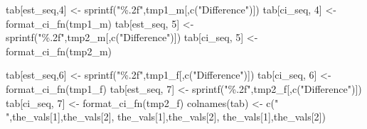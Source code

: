 \documentclass[
]{article}
\newenvironment{Shaded}{\begin{snugshade}}{\end{snugshade}}
\newcommand{\DecValTok}[1]{\textcolor[rgb]{0.00,0.00,0.81}{#1}}
\newcommand{\FunctionTok}[1]{\textcolor[rgb]{0.00,0.00,0.00}{#1}}
\newcommand{\NormalTok}[1]{#1}
\newcommand{\OtherTok}[1]{\textcolor[rgb]{0.56,0.35,0.01}{#1}}
\newcommand{\StringTok}[1]{\textcolor[rgb]{0.31,0.60,0.02}{#1}}
\begin{document}
\begin{Shaded}
\begin{Highlighting}[]
\NormalTok{  tab[est\_seq,}\DecValTok{4}\NormalTok{] }\OtherTok{\textless{}{-}} \FunctionTok{sprintf}\NormalTok{(}\StringTok{"\%.2f"}\NormalTok{,tmp1\_m[,}\FunctionTok{c}\NormalTok{(}\StringTok{"Difference"}\NormalTok{)])}
\NormalTok{  tab[ci\_seq, }\DecValTok{4}\NormalTok{] }\OtherTok{\textless{}{-}} \FunctionTok{format\_ci\_fn}\NormalTok{(tmp1\_m)}
\NormalTok{  tab[est\_seq, }\DecValTok{5}\NormalTok{] }\OtherTok{\textless{}{-}} \FunctionTok{sprintf}\NormalTok{(}\StringTok{"\%.2f"}\NormalTok{,tmp2\_m[,}\FunctionTok{c}\NormalTok{(}\StringTok{"Difference"}\NormalTok{)])}
\NormalTok{  tab[ci\_seq, }\DecValTok{5}\NormalTok{] }\OtherTok{\textless{}{-}} \FunctionTok{format\_ci\_fn}\NormalTok{(tmp2\_m)}
  
  
\NormalTok{  tab[est\_seq,}\DecValTok{6}\NormalTok{] }\OtherTok{\textless{}{-}} \FunctionTok{sprintf}\NormalTok{(}\StringTok{"\%.2f"}\NormalTok{,tmp1\_f[,}\FunctionTok{c}\NormalTok{(}\StringTok{"Difference"}\NormalTok{)])}
\NormalTok{  tab[ci\_seq, }\DecValTok{6}\NormalTok{] }\OtherTok{\textless{}{-}} \FunctionTok{format\_ci\_fn}\NormalTok{(tmp1\_f)}
\NormalTok{  tab[est\_seq, }\DecValTok{7}\NormalTok{] }\OtherTok{\textless{}{-}} \FunctionTok{sprintf}\NormalTok{(}\StringTok{"\%.2f"}\NormalTok{,tmp2\_f[,}\FunctionTok{c}\NormalTok{(}\StringTok{"Difference"}\NormalTok{)])}
\NormalTok{  tab[ci\_seq, }\DecValTok{7}\NormalTok{] }\OtherTok{\textless{}{-}} \FunctionTok{format\_ci\_fn}\NormalTok{(tmp2\_f)}
  \FunctionTok{colnames}\NormalTok{(tab) }\OtherTok{\textless{}{-}} \FunctionTok{c}\NormalTok{(}\StringTok{" "}\NormalTok{,the\_vals[}\DecValTok{1}\NormalTok{],the\_vals[}\DecValTok{2}\NormalTok{],}
\NormalTok{                     the\_vals[}\DecValTok{1}\NormalTok{],the\_vals[}\DecValTok{2}\NormalTok{],}
\NormalTok{                     the\_vals[}\DecValTok{1}\NormalTok{],the\_vals[}\DecValTok{2}\NormalTok{])}
  

\end{Highlighting}
\end{Shaded}
\end{document}
